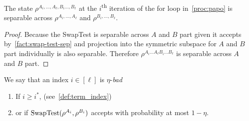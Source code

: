 \begin{claim}\label{claim:rho-separable}
  The state $\rho^{A_i,\ldots,A_ \ell, B_i\ldots, B_\ell}$ at the $i$\textsuperscript{th} iteration of the for loop in~\cref{proc:papo} is separable across $\rho^{A_i,\ldots, A_\ell}$ and $ \rho^{B_i,\ldots,B_\ell}$.
\end{claim}
\begin{proof}
Because the SwapTest is separable across $A$ and $B$ part given it accepts by~\cref{fact:swap-test-sep} and projection into the symmetric subspace for $A$ and $B$ part individually is also separable. 
Therefore $\rho^{A_i\ldots A_\ell B_i\ldots B_\ell}$ is separable across $A$ and $B$ part.
\end{proof}

\begin{definition}
We say that an index $i \in [\ell]$ is $\eta$-\emph{bad}
\begin{enumerate}
    \item If $i \ge i^*$, (see~\cref{def:term_index})
    \item or if $\textup{SwapTest}(\rho^{A_i}, \rho^{B_i})$ accepts with probability at most $1-\eta$.
\end{enumerate}
\end{definition}

